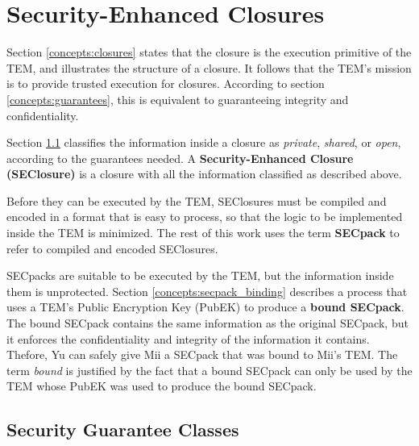 \section{Security-Enhanced Closures}\label{concepts:secure_closures}

Section \ref{concepts:closures} states that the closure is the execution
primitive of the TEM, and illustrates the structure of a closure. It follows
that the TEM's mission is to provide trusted execution for closures.
According to section \ref{concepts:guarantees}, this is equivalent to
guaranteeing integrity and confidentiality.

Section \ref{concepts:information_classes} classifies the information
inside a closure as \textit{private}, \textit{shared}, or \textit{open},
according to the guarantees needed. A \textbf{Security-Enhanced Closure (SEClosure)}
is a closure with all the information classified as described above.

Before they can be executed by the TEM, SEClosures must be compiled and encoded in a format that is easy to process, so that the logic to be implemented inside the TEM is minimized. The rest of this work uses the term \textbf{SECpack} to refer to compiled and encoded SEClosures.

SECpacks are suitable to be executed by the TEM, but the information inside
them is unprotected. Section \ref{concepts:secpack_binding} describes a
process that uses a TEM's Public Encryption Key (PubEK) to produce a
\textbf{bound SECpack}. The bound SECpack contains the same information as the
original SECpack, but it enforces the confidentiality and integrity of the
information it contains. Thefore, Yu can safely give Mii a SECpack that was
bound to Mii's TEM. The term \textit{bound} is justified by the fact that a
bound SECpack can only be used by the TEM whose PubEK was used to produce the
bound SECpack.

\subsection{Security Guarantee Classes}\label{concepts:information_classes}

